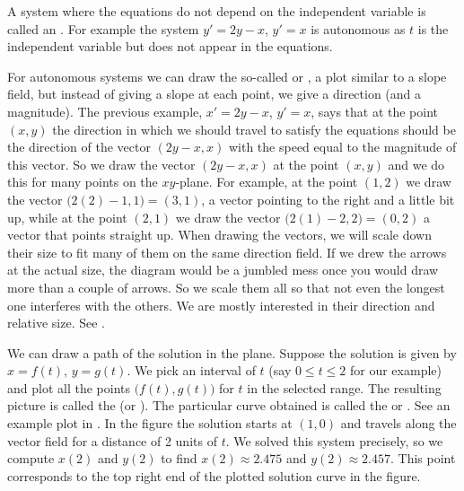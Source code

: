 A system where the equations do not depend on the independent variable
is called an \emph{}.  For example
the system $y'=2y-x$, $y'=x$ is autonomous as $t$ is the independent
variable but does not appear in the equations.

For autonomous systems we can draw the so-called
\emph{} or \emph{},
a plot similar to a slope field, but
instead of giving a slope at each point, we give a direction (and a
magnitude).  The previous example, $x' = 2y-x$, $y' = x$, says
that at the point $(x,y)$ the direction in which we should travel to satisfy
the equations should be the direction of the vector $( 2y-x, x )$
with the speed equal to the magnitude of this vector.  So we draw
the vector $(2y-x,x)$ at the point $(x,y)$ and we do this for
many points on the $xy$-plane.
For example, at the point $(1,2)$ we draw the vector
$\bigl(2(2)-1,1\bigr) = (3,1)$,
a vector pointing to the right and a little bit up,
while at the point $(2,1)$ we draw the vector $\bigl(2(1)-2,2\bigr) = (0,2)$
a vector that points straight up.
When drawing the vectors, we will scale down
their size to fit many of them on the same direction field.
If we drew the arrows at the actual size, the diagram would be a
jumbled mess once you would draw more than a couple of arrows.
So we scale them all so that not even the longest one interferes with
the others.
We are mostly 
interested in their direction and relative size.  See
.

We can draw a path of the solution in the plane.  Suppose the
solution is given by $x = f(t)$, $y=g(t)$.  We pick an interval
of $t$ (say $0 \leq t \leq 2$ for our example) and plot all the points
$\bigl(f(t),g(t)\bigr)$ for $t$ in the selected range.  The resulting picture is
called the \emph{}
(or ).
The particular curve obtained
is called the \emph{} or \emph{}.
See an example plot in .
In the figure the solution starts at $(1,0)$ and travels along the vector field
for a distance of 2 units of $t$.  We solved this system precisely, so
we compute $x(2)$ and $y(2)$ to find
$x(2) \approx 2.475$ and $y(2) \approx 2.457$.  This point corresponds
to the top right end of the plotted solution curve in the figure.

\begin{myfig}
\parbox[t]{3.0in}{
 \capstart
 \caption{The direction field for $x' = 2y-x$, $y' = x$.%
 \label{sintro-vectorfield:fig}}
}
\quad
\parbox[t]{3.0in}{
 \capstart
 \caption{The direction field for $x' = 2y-x$, $y' = x$ with
 the trajectory of the solution starting at $(1,0)$
 for $0 \leq t \leq 2$.%
 \label{sintro-vectorfield-sol:fig}}
}
\end{myfig}


